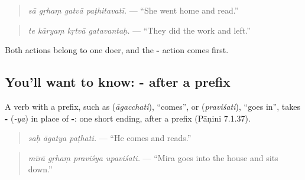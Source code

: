 \begin{quote}
\textbf{   }
\end{quote}

\begin{quote}
\emph{sā gṛhaṃ gatvā paṭhitavatī.} — \textquotedblleft{}She went home and read.\textquotedblright{}
\end{quote}

\begin{quote}
\textbf{   }
\end{quote}

\begin{quote}
\emph{te kāryaṃ kṛtvā gatavantaḥ.} — \textquotedblleft{}They did the work and left.\textquotedblright{}
\end{quote}

Both actions belong to one doer, and the \textbf{-} action comes first.

\subsection*{You'll want to know: - after a prefix}
A verb with a prefix, such as \textbf{} (\emph{āgacchati}), \textquotedblleft{}comes\textquotedblright{}, or \textbf{} (\emph{praviśati}), \textquotedblleft{}goes in\textquotedblright{}, takes \textbf{-} (\emph{-ya}) in place of \textbf{-}: one short ending, after a prefix (Pāṇini 7.1.37).

\begin{quote}
\textbf{  }
\end{quote}

\begin{quote}
\emph{saḥ āgatya paṭhati.} — \textquotedblleft{}He comes and reads.\textquotedblright{}
\end{quote}

\begin{quote}
\textbf{   }
\end{quote}

\begin{quote}
\emph{mīrā gṛhaṃ praviśya upaviśati.} — \textquotedblleft{}Mira goes into the house and sits down.\textquotedblright{}
\end{quote}

\begin{quote}
\textbf{  }
\end{quote}

